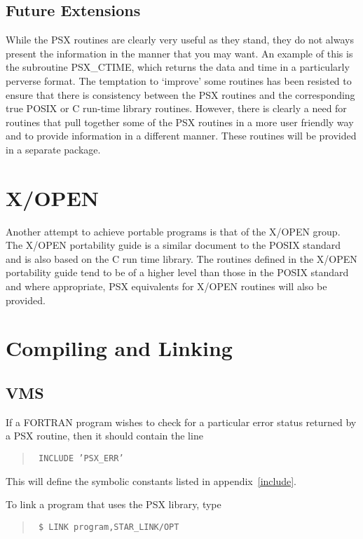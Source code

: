 \subsection{Future Extensions}

While the PSX routines are clearly very useful as they stand, they do not
always present the information in the manner that you may want. An example of
this is the subroutine PSX\_CTIME, which returns the data and time in a
particularly perverse format. The temptation to `improve' some routines has
been resisted to ensure that there is consistency between the PSX routines and
the corresponding true POSIX or C run-time library routines. However, there is
clearly a need for routines that pull together some of the PSX routines in a
more user friendly way and to provide information in a different manner. These
routines will be provided in a separate package.

\section{X/OPEN}

Another attempt to achieve portable programs is that of the X/OPEN group. The
X/OPEN portability guide is a similar document to the POSIX standard and is also
based on the C run time library. The routines defined in the X/OPEN portability
guide tend to be of a higher level than those in the POSIX standard and where
appropriate, PSX equivalents for X/OPEN routines will also be provided.

\section{Compiling and Linking}
\subsection{VMS}

If a FORTRAN program wishes to check for a particular error status returned by
a PSX routine, then it should contain the line

\begin{quote}{\tt
INCLUDE 'PSX\_ERR'
}
\end{quote}

This will define the symbolic constants listed in appendix~\ref{include}.

To link a program that uses the PSX library, type

\begin{quote}{\tt
\$ LINK program,STAR\_LINK/OPT
}
\end{quote}

